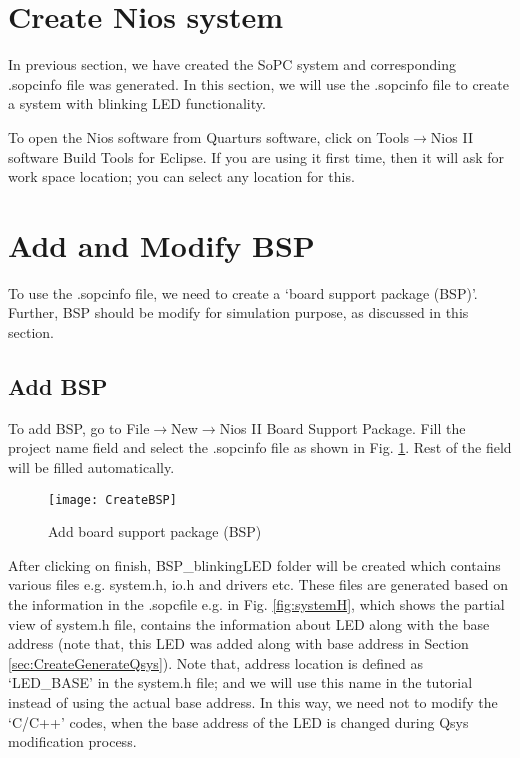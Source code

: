 \section{Create Nios system} \label{sec:Nios_create_sys}
In previous section, we have created the SoPC system and corresponding .sopcinfo file was generated. In this section, we will use the .sopcinfo file to create a system with blinking LED functionality. 

To open the Nios software from Quarturs software, click on Tools$\rightarrow$Nios II software Build Tools for Eclipse. If you are using it first time, then it will ask for work space location; you can select any location for this.  

\section{Add and Modify BSP} \label{sec:add_modify_bsp}
To use the .sopcinfo file, we need to create a `board support package (BSP)'. Further, BSP should be modify for simulation purpose, as discussed in this section.

\subsection{Add BSP}\label{sec:AddBSP}
To add BSP, go to File$\rightarrow$New$\rightarrow$Nios II Board Support Package. Fill the project name field and select the .sopcinfo file as shown in Fig. \ref{fig:CreateBSP}. Rest of the field will be filled automatically. 
	\begin{figure}[!h]
		\centering
		\texttt{[image: CreateBSP]}
		\caption{Add board support package (BSP)}
		\label{fig:CreateBSP}
	\end{figure}

After clicking on finish, BSP\_blinkingLED folder will be created which contains various files e.g. system.h, io.h and drivers etc. These files are generated based on the information in the .sopcfile e.g. in Fig. \ref{fig:systemH}, which shows the partial view of system.h file, contains the information about LED along with the base address (note that, this LED was added along with base address in Section \ref{sec:CreateGenerateQsys}).  Note that, address location is defined as `LED\_BASE' in the system.h file; and we will use this name in the tutorial instead of using the actual base address. In this way, we need not to modify the `C/C++' codes, when the base address of the LED is changed during Qsys modification process.  

